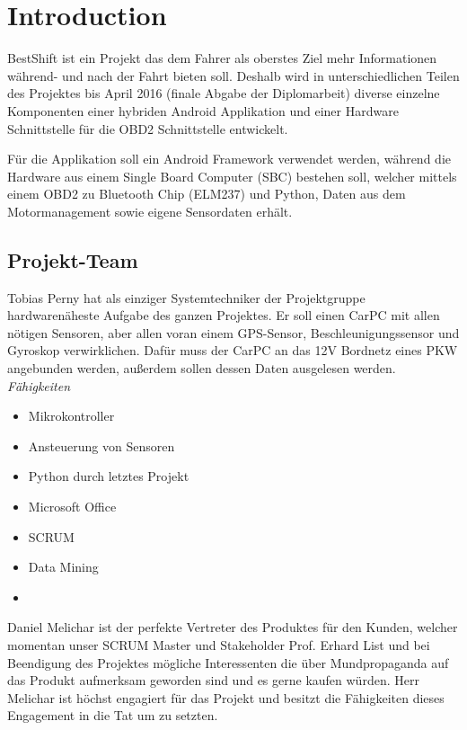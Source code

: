 \chapter{Introduction}
BestShift ist ein Projekt das dem Fahrer als oberstes Ziel mehr Informationen während- und nach der Fahrt bieten soll. Deshalb wird in unterschiedlichen Teilen des Projektes bis April 2016 (finale Abgabe der Diplomarbeit) diverse einzelne Komponenten einer hybriden Android Applikation und einer Hardware Schnittstelle für die OBD2 Schnittstelle entwickelt. 

Für die Applikation soll ein Android Framework verwendet werden, während die Hardware aus einem Single Board Computer (SBC) bestehen soll, welcher mittels einem OBD2 zu Bluetooth Chip (ELM237) und Python, Daten aus dem Motormanagement sowie eigene Sensordaten erhält. 

\section{Projekt-Team}
Tobias Perny hat als einziger Systemtechniker der Projektgruppe hardwarenäheste Aufgabe des ganzen Projektes. Er soll einen CarPC mit allen nötigen Sensoren, aber allen voran einem GPS-Sensor, Beschleunigungssensor und Gyroskop verwirklichen. Dafür muss der CarPC an das 12V Bordnetz eines PKW angebunden werden, außerdem sollen dessen Daten ausgelesen werden. 
\textit{Fähigkeiten}
\begin{itemize}
	\item Mikrokontroller
	\item Ansteuerung von Sensoren		
	\item Python durch letztes Projekt
	\item Microsoft Office
	\item SCRUM
	\item Data Mining
	\item {}
\end{itemize}


Daniel Melichar ist der perfekte Vertreter des Produktes für den Kunden, welcher momentan unser SCRUM Master und Stakeholder Prof. Erhard List und bei Beendigung des Projektes mögliche Interessenten die über Mundpropaganda auf das Produkt aufmerksam geworden sind und es gerne kaufen würden. Herr Melichar ist höchst engagiert für das Projekt und besitzt die Fähigkeiten dieses Engagement in die Tat um zu setzten.

